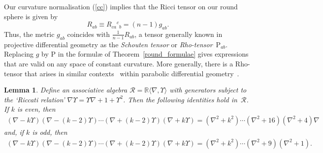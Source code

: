 \documentclass[11pt]{article}
\newtheorem{lemma}{Lemma}
\newcommand{\Rho}{{\mathrm{P}}}
\begin{document}
\begin{remark}Our curvature normalisation (\ref{cc}) implies that the Ricci
tensor on our round sphere is given by
\[R_{ab}\equiv R_{ca}{}^c{}_b=(n-1)g_{ab}.\]
Thus, the metric $g_{ab}$ coincides with $\frac{1}{n-1}R_{ab}$, a tensor
generally known in projective dif\/ferential geometry \cite{eProjective} as the
{\em Schouten tensor\/} or {\em Rho-tensor\/}~$\Rho_{ab}$. Replacing $g$ by
$\Rho$ in the formul{\ae} of Theorem~\ref{round_formulae} gives expressions
that are valid on any space of constant curvature. More generally, there is a
Rho-tensor that arises in similar contexts~\cite{cds} within parabolic
dif\/ferential geometry~\cite{thebook}.
\end{remark}
\begin{lemma}\label{pretricky} Define an associative algebra
${\mathcal{R}}={\mathbb{R}}\langle\nabla,\Upsilon\rangle$ with generators
subject to the `Riccati relation'
$\nabla\Upsilon=\Upsilon\nabla+1+\Upsilon^2$. Then the following identities
hold in~${\mathcal{R}}$. If $k$ is even, then
\begin{gather*}
(\nabla-k\Upsilon)(\nabla-(k-2)\Upsilon)\cdots
(\nabla+(k-2)\Upsilon)(\nabla+k\Upsilon)=
(\nabla^2+k^2)\cdots(\nabla^2+16)(\nabla^2+4)\nabla\!
\end{gather*}
and, if $k$ is odd, then
\begin{gather*}
(\nabla-k\Upsilon)(\nabla-(k-2)\Upsilon)\cdots
(\nabla+(k-2)\Upsilon)(\nabla+k\Upsilon)=
(\nabla^2+k^2)\cdots(\nabla^2+9)(\nabla^2+1).
\end{gather*}
\end{lemma}
\end{document}
